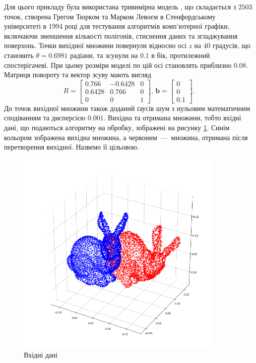 Для цього прикладу була використана тривимірна модель \cite{bunny},
що складається з $2503$ точок, створена Грегом Тюрком та Марком Левоєм в
Стенфордському університеті в 1994 році для тестування алгоритмів комп'ютерної
графіки, включаючи зменшення кількості полігонів,
стиснення даних та згладжування поверхонь.
Точки вихідної множини повернули відносно осі $z$ на $40$ градусів,
що становить $\theta = 0.6981$ радіани, та зсунули на $0.1$ в бік,
протилежний спостерігачеві.
При цьому розміри моделі по цій осі становлять приблизно $0.08$.
Матриця повороту та вектор зсуву мають вигляд
\begin{equation*}
  R = \begin{bmatrix}
    0.766  & -0.6428 & 0 \\
    0.6428 & 0.766   & 0 \\
    0      & 0       & 1
  \end{bmatrix}, \,
  \boldsymbol{b} =
  \begin{bmatrix}
    0 \\
    0 \\
    0.1
  \end{bmatrix}.
\end{equation*}
До точок вихідної множини також доданий ґаусів шум з нульовим математичним
сподіванням та дисперсією $0.001$.
Вихідна та отримана множини, тобто вхідні дані,
що подаються алгоритму на обробку, зображені на рисунку \ref{fig:bunny:input}.
Синім кольором зображена вихідна множина, а червоним~---~множина,
отримана після перетворення вихідної.
Назвемо її цільовою.

\begin{figure}[h]
  \centering
    \includegraphics[width=0.9\textwidth]{images/bunny_input}
  \caption{Вхідні дані}
  \label{fig:bunny:input}
\end{figure}

